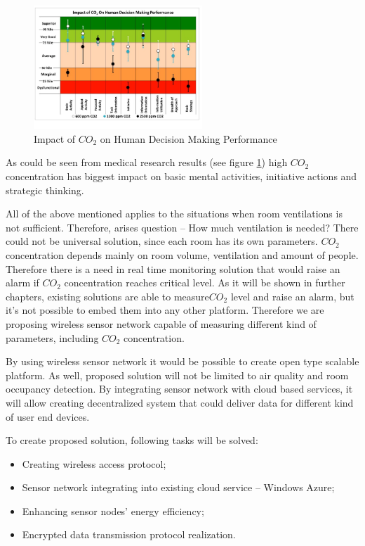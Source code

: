 \documentclass[journal]{IEEEtran}
\begin{document}
\begin{figure}[h]
\centering
\includegraphics[width=2.5in]{co2_}
\caption{Impact of $CO_2$ on Human Decision Making Performance}
\label{co2_}
\end{figure}

As could be seen from medical research results (see figure \ref{co2_}) high $CO_2$ concentration has biggest impact on basic mental activities, initiative actions and strategic thinking.

All of the above mentioned applies to the situations when room ventilations is not sufficient. Therefore, arises question – How much ventilation is needed? There could not be universal solution, since each room has its own parameters. $CO_2$ concentration depends mainly on room volume, ventilation and amount of people. Therefore there is a need in real time monitoring solution that would raise an alarm if $CO_2$ concentration reaches critical level. As it will be shown in further chapters, existing solutions are able to measure$CO_2$ level and raise an alarm, but it’s not possible to embed them into any other platform. Therefore we are proposing wireless sensor network capable of measuring different kind of parameters, including $CO_2$ concentration.

By using wireless sensor network it would be possible to create open type scalable platform. As well, proposed solution will not be limited to air quality and room occupancy detection. By integrating sensor network with cloud based services, it will allow creating decentralized system that could deliver data for different kind of user end devices.

To create proposed solution, following tasks will be solved:
\begin{itemize}
\item Creating wireless access protocol;
\item Sensor network integrating into existing cloud service – Windows Azure;
\item Enhancing sensor nodes’ energy efficiency;
\item Encrypted data transmission protocol realization.
\end{itemize}
\end{document}
